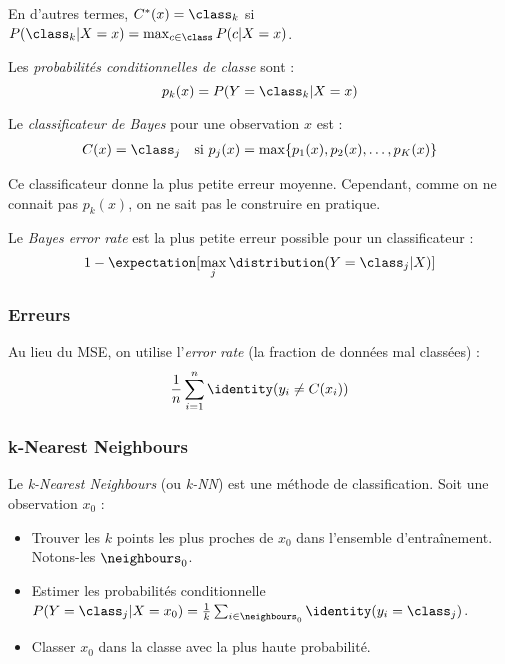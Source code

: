         En d'autres termes, \(C^*(x) = \class_k\) si \(P(\class_k | X = x) = \max_{c\in\class} P(c|X=x)\).

        \begin{definition}
            Les \textit{probabilités conditionnelles de classe} sont :
            \[
                p_k(x) = P(Y = \class_k | X = x)
            \]

            Le \textit{classificateur de Bayes} pour une observation \(x\) est :
            \begin{align*}
                C(x) &= \class_j & \text{si } p_j(x) = \max\{p_1(x), p_2(x), \dots, p_K(x)\}
            \end{align*}
        \end{definition}

        Ce classificateur donne la plus petite erreur moyenne. Cependant, comme on ne connait pas \(p_k(x)\), on ne sait pas le construire en pratique.

        \begin{definition}
            Le \textit{Bayes error rate} est la plus petite erreur possible pour un classificateur :
            \[
                1 - \expectation[\max_j \distribution(Y = \class_j | X)]
            \]
        \end{definition}

    \subsubsection{Erreurs}
        \begin{definition}
            Au lieu du MSE, on utilise l'\textit{error rate} (la fraction de données mal classées) :
            \[
                \frac{1}{n}\sum_{i=1}^n \identity(y_i \not= C(x_i))
            \]
        \end{definition}

    \subsubsection{k-Nearest Neighbours}
        \begin{definition}
            Le \textit{k-Nearest Neighbours} (ou \textit{k-NN}) est une méthode de classification. Soit une observation \(x_0\) :
            \begin{itemize}
                \item Trouver les \(k\) points les plus proches de \(x_0\) dans l'ensemble d'entraînement. Notons-les \(\neighbours_0\).
                \item Estimer les probabilités conditionnelle \(P(Y = \class_j | X = x_0) = \frac{1}{k} \sum_{i\in\neighbours_0}\identity(y_i = \class_j)\).
                \item Classer \(x_0\) dans la classe avec la plus haute probabilité.
            \end{itemize}
        \end{definition}

